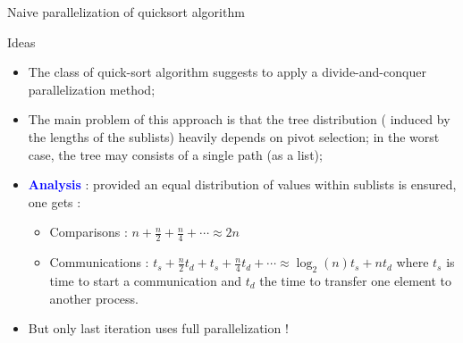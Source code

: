 \documentclass[compress,10pt,aspectratio=169]{beamer}
\begin{document}
\begin{frame}[fragile]{Naive parallelization of quicksort algorithm}
    \scriptsize
    \begin{block}{Ideas}
        \begin{itemize}
            \item The class of quick-sort algorithm suggests to apply a divide-and-conquer parallelization method;
            \item The main problem of this approach is that the tree distribution ( induced by the lengths of the sublists)
                  heavily depends on pivot selection; in the worst case, the tree may consists of a single path (as a list);
            \item \textcolor{blue}{\bf Analysis} : provided an equal distribution of values within sublists is ensured, one gets :
            \begin{itemize}
                \item {\scriptsize Comparisons : $\displaystyle n + \frac{n}{2} + \frac{n}{4} + \cdots \approx 2n$}
                \item {\scriptsize Communications : $t_{s} + \frac{n}{2}t_{d} + t_{s} + \frac{n}{4}t_{d} + \cdots \approx \log_{2}(n)t_{s} + nt_{d}$ where $t_{s}$ is time to start a communication
                      and $t_{d}$ the time to transfer one element to another process.}
            \end{itemize}
            \item But only last iteration uses full parallelization !
        \end{itemize}
    \end{block}
\end{frame}
\end{document}
